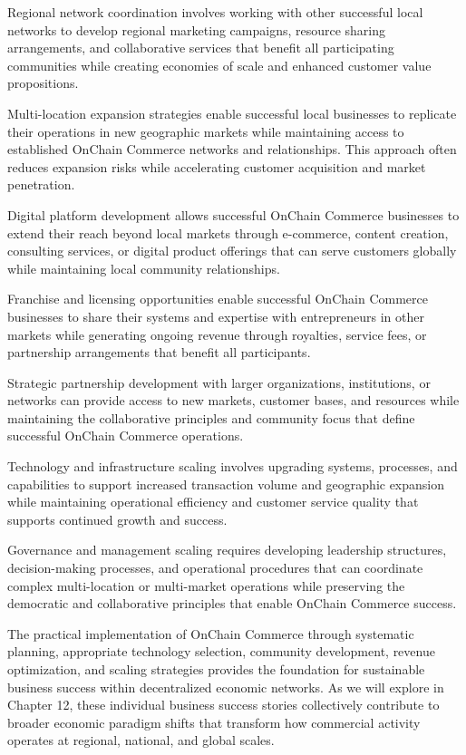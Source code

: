\documentclass[
  Letterpaper,
]{scrbook}
\begin{document}
Regional network coordination involves working with other successful
local networks to develop regional marketing campaigns, resource sharing
arrangements, and collaborative services that benefit all participating
communities while creating economies of scale and enhanced customer
value propositions.

Multi-location expansion strategies enable successful local businesses
to replicate their operations in new geographic markets while
maintaining access to established OnChain Commerce networks and
relationships. This approach often reduces expansion risks while
accelerating customer acquisition and market penetration.

Digital platform development allows successful OnChain Commerce
businesses to extend their reach beyond local markets through
e-commerce, content creation, consulting services, or digital product
offerings that can serve customers globally while maintaining local
community relationships.

Franchise and licensing opportunities enable successful OnChain Commerce
businesses to share their systems and expertise with entrepreneurs in
other markets while generating ongoing revenue through royalties,
service fees, or partnership arrangements that benefit all participants.

Strategic partnership development with larger organizations,
institutions, or networks can provide access to new markets, customer
bases, and resources while maintaining the collaborative principles and
community focus that define successful OnChain Commerce operations.

Technology and infrastructure scaling involves upgrading systems,
processes, and capabilities to support increased transaction volume and
geographic expansion while maintaining operational efficiency and
customer service quality that supports continued growth and success.

Governance and management scaling requires developing leadership
structures, decision-making processes, and operational procedures that
can coordinate complex multi-location or multi-market operations while
preserving the democratic and collaborative principles that enable
OnChain Commerce success.

The practical implementation of OnChain Commerce through systematic
planning, appropriate technology selection, community development,
revenue optimization, and scaling strategies provides the foundation for
sustainable business success within decentralized economic networks. As
we will explore in Chapter 12, these individual business success stories
collectively contribute to broader economic paradigm shifts that
transform how commercial activity operates at regional, national, and
global scales.
\end{document}
